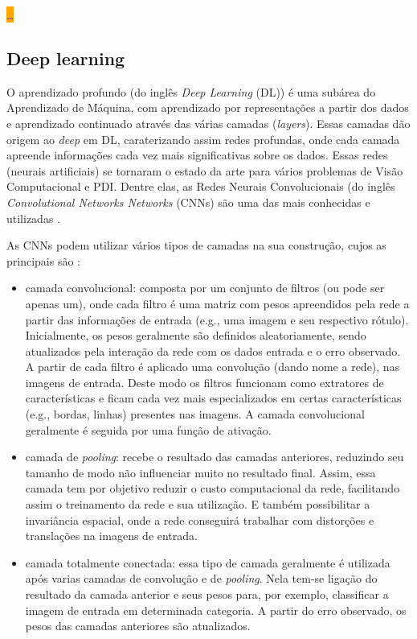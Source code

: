 \documentclass[12pt, a4paper, english, brazil]{article}
\newcommand{\dotsBlue}{\colorbox{orange}{\textcolor{blue}{\dots}}}
\begin{document}
\dotsBlue

\subsection{Deep learning}

O aprendizado profundo (do inglês \textit{Deep Learning} (DL)) é uma subárea do Aprendizado de Máquina, com aprendizado por representações a partir dos dados e aprendizado continuado através das várias camadas (\textit{layers}). Essas camadas dão origem ao \textit{deep} em DL, caraterizando assim redes profundas, onde cada camada apreende informações cada vez mais significativas sobre os dados. Essas redes (neurais artificiais) se tornaram o estado da arte para vários problemas de Visão Computacional e PDI. Dentre elas, as Redes Neurais Convolucionais (do inglês \textit{Convolutional Networks Networks} (CNNs) são uma das mais conhecidas e utilizadas \cite{Ponti_2017}.

As CNNs podem utilizar vários tipos de camadas na sua construção, cujos as principais são \cite{Rawat_Wang_2017}:

\begin{itemize}

    \item camada convolucional: composta por um conjunto de filtros (ou pode ser apenas um), onde cada filtro é uma matriz com pesos apreendidos pela rede a partir das informações de entrada (e.g., uma imagem e seu respectivo rótulo). Inicialmente, os pesos geralmente são definidos aleatoriamente, sendo atualizados pela interação da rede com os dados entrada e o erro observado. A partir de cada filtro é aplicado uma convolução (dando nome a rede), nas imagens de entrada. Deste modo os filtros funcionam como extratores de características e ficam cada vez mais especializados em certas características (e.g., bordas, linhas) presentes nas imagens. A camada convolucional geralmente é seguida por uma função de ativação.

    \item camada de \textit{pooling}: recebe o resultado das camadas anteriores, reduzindo seu tamanho de modo não influenciar muito no resultado final. Assim, essa camada tem por objetivo reduzir o custo computacional da rede, facilitando assim o treinamento da rede e sua utilização. E também possibilitar a invariância espacial, onde a rede conseguirá trabalhar com distorções e translações na imagens de entrada.

    \item camada totalmente conectada: essa tipo de camada geralmente é utilizada após varias camadas de convolução e de \textit{pooling}. Nela tem-se ligação do resultado da camada anterior e seus pesos para, por exemplo, classificar a imagem de entrada em determinada categoria. A partir do erro observado, os pesos das camadas anteriores são atualizados.

\end{itemize}
\end{document}

